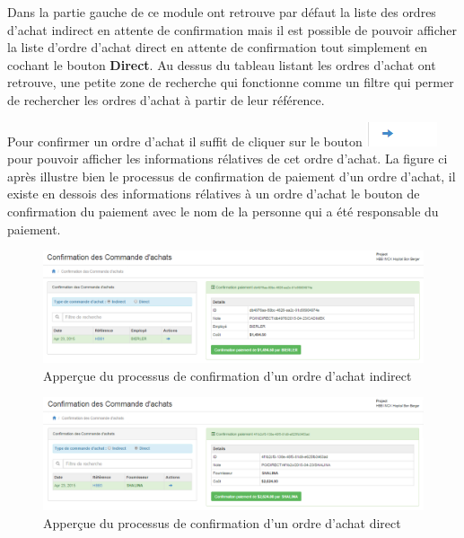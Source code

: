 \documentclass[12pt,a4paper]{report}
\begin{document}
Dans la partie gauche de ce module ont retrouve par défaut la liste des ordres d'achat indirect en attente de confirmation mais il est possible de pouvoir afficher la liste d'ordre d'achat direct en attente de confirmation tout simplement en cochant le bouton \textbf{Direct}. Au dessus du tableau listant les ordres d'achat ont retrouve, une petite zone de recherche qui fonctionne comme un filtre qui permer de rechercher les ordres d'achat à partir de leur référence.

Pour confirmer un ordre d'achat il suffit de cliquer sur le bouton \includegraphics[scale=0.7]{pic/BlueArrow.png} pour pouvoir afficher les informations rélatives de cet ordre d'achat. La figure ci après illustre bien le processus de confirmation de paiement d'un ordre d'achat, il existe en dessois des informations rélatives à un ordre d'achat le bouton de confirmation du paiement avec le nom de la personne qui a été responsable du paiement.

\begin{figure}[h]
\begin{center}
\includegraphics[width=12cm]{pic/ConfPOAchat.png}
\end{center}
\caption{Apperçue du processus de confirmation d'un ordre d'achat indirect}
\label{Apperçue du processus de confirmation d'un ordre d'achat indirect}
\end{figure} 

\begin{figure}[h]
\begin{center}
\includegraphics[width=12cm]{pic/ConfPOAchatDirect.png}
\end{center}
\caption{Apperçue du processus de confirmation d'un ordre d'achat direct}
\label{Apperçue du processus de confirmation d'un ordre d'achat direct}
\end{figure} 
\end{document}
